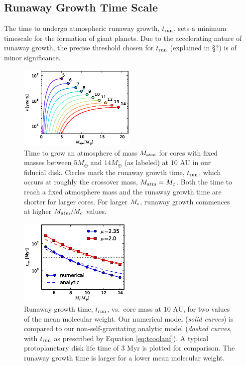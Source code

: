 \documentclass[apj, numberedappendix]{emulateapj}
\newcommand{\co}{_{\rm c}}
\begin{document}
\subsection{Runaway Growth Time Scale}
\label{sec:tcross}
The time to undergo atmospheric runaway growth, $t_{\rm run}$, sets a minimum timescale for the formation of giant planets.  Due to the accelerating nature of runaway growth, the precise threshold chosen for $t_{\rm run}$ (explained in \S ?) is of minor significance.

\begin{figure}[tb]
\hspace{-.1in}
\includegraphics[width=0.5\textwidth]{../../figs/ModelAtmospheres/RadSelfGravPoly/PaperFigs/cumul_coolingtime_vs_Matm_10au_mu235.eps}
\caption{Time to grow an atmosphere of mass $M_{\rm{atm}}$ for cores with fixed masses between $5 M_{\oplus}$ and $14 M_{\oplus}$ (as labeled) at $10$ AU in our fiducial disk. Circles mark the runaway growth time, $t_{\rm run}$, which occurs at roughly the crossover mass, $M_{\rm{atm}} = M\co$.  Both the time to reach a fixed atmosphere mass and the runaway growth time are shorter for larger cores. For larger $M\co$, runaway growth commences at higher $M_{\rm atm}/M\co$ values.}
\label{fig:tvsM}
\end{figure}

\begin{figure}[htb]
\centering
\includegraphics[width=0.48\textwidth]{../../figs/ModelAtmospheres/RadSelfGravPoly/PaperFigs/coolingtime_vs_Mc_10au.eps}
\caption{Runaway growth time, $t_{\rm{run}}$, vs.\ core mass at $10$ AU, for two values of the mean molecular weight.  Our numerical model (\emph{solid curves}) is compared to our non-self-gravitating analytic model (\emph{dashed curves}, with $t_{\rm run}$ as prescribed by Equation \ref{eq:tcoolanf}).  A typical protoplanetary disk life time of $3$ Myr is plotted for comparison. The runaway growth time is larger for a lower mean molecular weight.}
\label{fig:tvsMcomp}
\end{figure}
\end{document}
